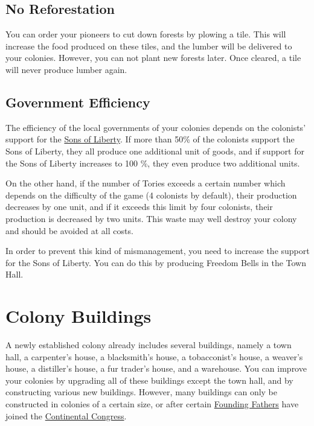 \documentclass[12pt]{book}
\begin{document}
\hypertarget{No Reforestation}{\subsection{No Reforestation}}

You can order your pioneers to cut down forests by plowing a tile.
This will increase the food produced on these tiles, and the lumber
will be delivered to your colonies. However, you can not plant new
forests later. Once cleared, a tile will never produce lumber again.


\hypertarget{Government Efficiency}{\subsection{Government Efficiency}}

The efficiency of the local governments of your colonies depends on
the colonists' support for the \hyperlink{Sons of Liberty}{Sons of
  Liberty}. If more than 50\% of the colonists support the Sons of
Liberty, they all produce one additional unit of goods, and if support
for the Sons of Liberty increases to 100 \%, they even produce two
additional units. 

On the other hand, if the number of Tories exceeds a certain number
which depends on the difficulty of the game (4 colonists by default),
their production decreases by one unit, and if it exceeds this limit
by four colonists, their production is decreased by two units. This
waste may well destroy your colony and should be avoided at all
costs.

In order to prevent this kind of mismanagement, you need to increase
the support for the Sons of Liberty. You can do this by producing
Freedom Bells in the Town Hall.


\hypertarget{Colony Buildings}{\section{Colony Buildings}}

A newly established colony already includes several buildings, namely
a town hall, a carpenter's house, a blacksmith's house, a
tobacconist's house, a weaver's house, a distiller's house, a fur
trader's house, and a warehouse. You can improve your colonies by
upgrading all of these buildings except the town hall, and by
constructing various new buildings. However, many buildings can only
be constructed in colonies of a certain size, or after certain
\hyperlink{Founding Fathers}{Founding Fathers} have joined the
\hyperlink{Continental Congress}{Continental Congress}.
\end{document}
